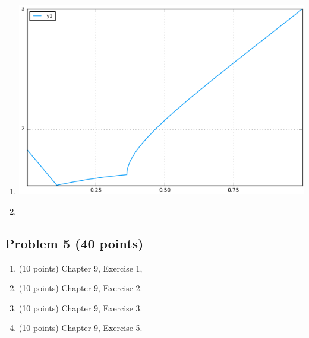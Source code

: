\documentclass[]{article}
\begin{document}
\begin{enumerate}
\item
\hfill \break
\includegraphics[width=\textwidth,keepaspectratio]{Problem4Images/problem4part4.png}
\item
\end{enumerate}



\subsection{Problem 5 (40 points)}\label{problem-5-40-points}

\begin{enumerate}
\def\labelenumi{\arabic{enumi}.}
\itemsep1pt\parskip0pt
\item
  (10 points) Chapter 9, Exercise 1,
\item
  (10 points) Chapter 9, Exercise 2.
\item
  (10 points) Chapter 9, Exercise 3.
\item
  (10 points) Chapter 9, Exercise 5.
\end{enumerate}
\end{document}
